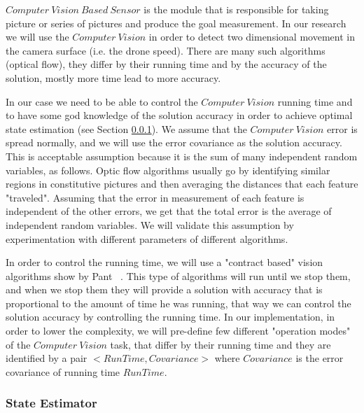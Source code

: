 \documentclass[11pt]{article}
\begin{document}
$Computer~Vision~Based~Sensor$ is the module that is responsible for taking picture or series of pictures and produce the goal measurement.
In our research we will use the $Computer~Vision$ in order to detect two dimensional movement in the camera surface (i.e. the drone speed).
There are many such algorithms (optical flow), they differ by their running time and by the accuracy of the solution, mostly more time lead to more accuracy.

In our case we need to be able to control the $Computer~Vision$ running time and to have some god knowledge of the solution accuracy in order to achieve optimal state estimation (see Section \ref{sec:estimator}).
We assume that the $Computer~Vision$ error is spread normally, and we will use the error covariance as the solution accuracy. 
This is acceptable assumption because it is the sum of many independent random variables, as follows. Optic flow algorithms usually go by identifying similar regions in constitutive pictures and then averaging the distances that each feature "traveled". Assuming that the error in measurement of each feature is independent of the other errors, we get that the total error is the average of independent random variables. We will validate this assumption by experimentation with different parameters of different algorithms.

In order to control the running time, we will use a "contract based" vision algorithms show by Pant ~\cite{UPenn-Pant}.
This type of algorithms will run until we stop them, and when we stop them they will provide a solution with accuracy that is proportional to the amount of time he was running, that way we can control the solution accuracy by controlling the running time.
In our implementation, in order to lower the complexity, we will pre-define few different "operation modes" of the $Computer~Vision$ task, that differ by their running time and they are identified by a pair $<RunTime, Covariance>$ where $Covariance$ is the error covariance of running time $RunTime$.

\subsubsection{State Estimator}
\label{sec:estimator}
\end{document}
